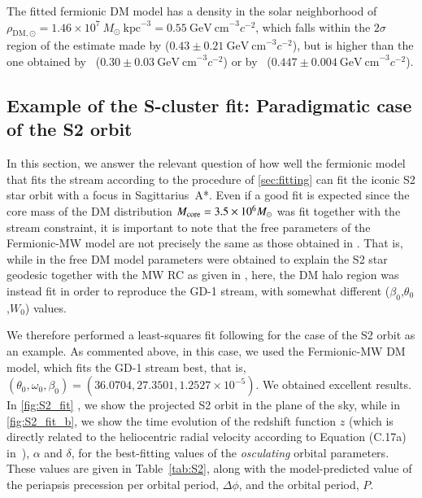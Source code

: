 \documentclass[referee]{aa} %
\begin{document}
The fitted fermionic DM model has a density in the solar neighborhood of
$\rho_{\mathrm{DM},\odot}=1.46\times10^7~M_\odot~\mathrm{kpc}^{-3}=0.55~\mathrm{GeV~cm}^{-3} c^{-2}$, which falls within the $2\sigma$ region of the estimate made by \citealt{Salucci2010} ($0.43\pm 0.21~\mathrm{GeV~cm}^{-3} c^{-2}$),
but is higher than the one obtained by~\citealt{Eilers_2019} ($0.30\pm0.03~\mathrm{GeV~cm}^{-3} c^{-2}$) or by~\citealt{Ou_2024MNRAS} ($0.447\pm0.004~\mathrm{GeV~cm}^{-3} c^{-2}$).

\subsection{Example of the S-cluster fit: Paradigmatic case of the S2 orbit}
In this section, we answer the relevant question of how well the fermionic model that fits the stream according to the procedure of \cref{sec:fitting} can fit the iconic S2 star orbit with a focus in Sagittarius~A*. Even if a good fit is expected since the core mass of the DM distribution $M_{\rm{core}}=3.5\times 10^6 M_\odot$ was fit together with the stream constraint, it is important to note that the free parameters of the Fermionic-MW model are not precisely the same as those obtained in \cite{2020A&A...641A..34B}. That is, while in \cite{2020A&A...641A..34B} the free DM model parameters were obtained to explain the S2 star geodesic together with the MW RC as given in \cite{sofue_rotation_2013}, here, the DM halo region was instead fit in order to reproduce the GD-1 stream, with somewhat different ($\beta_0$,$\theta_0$,$W_0$) values.

We therefore performed a least-squares fit following \cite{2020A&A...641A..34B} for the case of the S2 orbit as an example. As commented above, in this case, we used the Fermionic-MW DM model, which fits the GD-1 stream best, that is, $(\theta_0, \omega_0, \beta_0)= (36.0704, 27.3501, 1.2527\times10^{-5})$. We obtained excellent results. In \cref{fig:S2_fit} , we show the projected S2 orbit in the plane of the sky, while in \cref{fig:S2_fit_b}, we show the time evolution of the redshift function $z$ (which is directly related to the heliocentric radial velocity according to Equation (C.17a) in~\citealp{2020A&A...641A..34B}), $\alpha$ and $\delta$, for the best-fitting values of the \textit{osculating} orbital parameters. These values are given in Table~\ref{tab:S2}, along with the model-predicted value of the periapsis precession per orbital period, $\Delta \phi$, and the orbital period, $P$.
\end{document}
